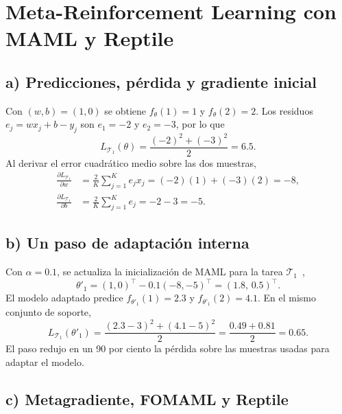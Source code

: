 \section{Meta-Reinforcement Learning con MAML y Reptile}

\subsection*{a) Predicciones, pérdida y gradiente inicial}

Con $(w,b)=(1,0)$ se obtiene $f_\theta(1)=1$ y $f_\theta(2)=2$.
Los residuos $e_j=wx_j+b-y_j$ son $e_1=-2$ y $e_2=-3$, por lo que
\[
    L_{\mathcal{T}_1}(\theta)
    =\frac{(-2)^2+(-3)^2}{2}=6.5.
\]
Al derivar el error cuadrático medio sobre las dos muestras,
\begin{align*}
    \frac{\partial L_{\mathcal{T}_1}}{\partial w}
    &=\frac{2}{K}\sum_{j=1}^K e_j x_j
      =(-2)(1)+(-3)(2)=-8,\\
    \frac{\partial L_{\mathcal{T}_1}}{\partial b}
    &=\frac{2}{K}\sum_{j=1}^K e_j
      =-2-3=-5.
\end{align*}

\subsection*{b) Un paso de adaptación interna}

Con $\alpha=0.1$, se actualiza la inicialización de MAML para la
tarea $\mathcal{T}_1$~\cite{finn2017},
\[
    \theta'_1=(1,0)^\top-0.1(-8,-5)^\top
    =\boxed{(1.8,\,0.5)^\top}.
\]
El modelo adaptado predice $f_{\theta'_1}(1)=2.3$ y
$f_{\theta'_1}(2)=4.1$. En el mismo conjunto de soporte,
\[
    L_{\mathcal{T}_1}(\theta'_1)
    =\frac{(2.3-3)^2+(4.1-5)^2}{2}
    =\frac{0.49+0.81}{2}=\boxed{0.65}.
\]
El paso redujo en un 90 por ciento la pérdida sobre las muestras usadas
para adaptar el modelo.

\subsection*{c) Metagradiente, FOMAML y Reptile}

